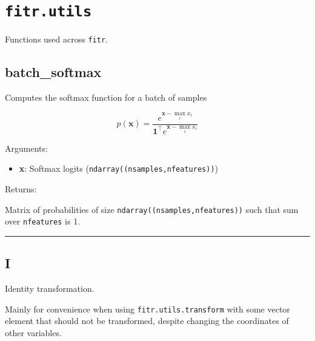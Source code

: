 \section{\texorpdfstring{\texttt{fitr.utils}}{fitr.utils}}\label{fitr.utils}

Functions used across \texttt{fitr}.

\subsection{batch\_softmax}\label{batch_softmax}

\begin{Shaded}
\begin{Highlighting}[]
\OperatorTok{=}\NormalTok{)}
\end{Highlighting}
\end{Shaded}

Computes the softmax function for a batch of samples

\[
p(\mathbf{x}) = \frac{e^{\mathbf{x} - \max_i x_i}}{\mathbf{1}^\top e^{\mathbf{x} - \max_i x_i}}
\]

Arguments:

\begin{itemize}
\tightlist
\item
  \textbf{x}: Softmax logits (\texttt{ndarray((nsamples,nfeatures))})
\end{itemize}

Returns:

Matrix of probabilities of size \texttt{ndarray((nsamples,nfeatures))}
such that sum over \texttt{nfeatures} is 1.

\begin{center}\rule{0.5\linewidth}{\linethickness}\end{center}

\subsection{I}\label{i}

\begin{Shaded}
\begin{Highlighting}[]
\end{Highlighting}
\end{Shaded}

Identity transformation.

Mainly for convenience when using \texttt{fitr.utils.transform} with
some vector element that should not be transformed, despite changing the
coordinates of other variables.

